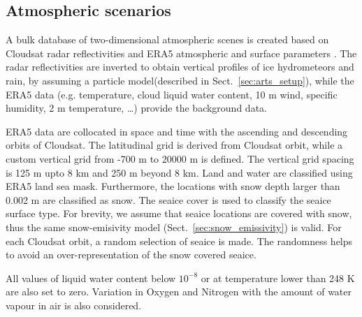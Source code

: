 \documentclass[amt, manuscript]{copernicus}
\begin{document}



\subsection{Atmospheric scenarios}
\label{sec:atm_scenes}

A bulk database of two-dimensional atmospheric scenes is created based on Cloudsat radar reflectivities \citep{marchand:hydro:08} and ERA5 atmospheric and surface parameters \citep{era5:18}. The radar reflectivities are inverted to obtain vertical profiles of ice hydrometeors and rain, by assuming a particle model(described in Sect.~\ref{sec:arts_setup}), while the ERA5 data (e.g. temperature, cloud liquid water content, 10\,\,m wind, specific humidity, 2\,\,m temperature, \dots) provide the background data.

ERA5 data are collocated in space and time with the ascending and descending orbits of Cloudsat. The latitudinal grid is derived from Cloudsat orbit, while a custom vertical grid from -700\,\,m to 20000\,\,m is defined. The vertical grid spacing is 125\,\,m upto 8\,\,km and 250\,\,m beyond 8\,\,km. Land and water are classified using ERA5 land sea mask. Furthermore, the locations with snow depth larger than 0.002\,\,m are classified as snow. The seaice cover is used to classify the seaice surface type. For brevity, we assume that seaice locations are covered with snow, thus the same snow-emisivity model (Sect.~\ref{sec:snow_emissivity}) is valid. For each Cloudsat orbit, a random selection of seaice is made. The randomness helps to avoid an over-representation of the snow covered seaice. 

All values of liquid water content below $10^{-8}$ or at temperature lower than 248\,\,K are also set to zero. Variation in Oxygen and Nitrogen with the amount of water vapour in air is also considered.  
\end{document}
